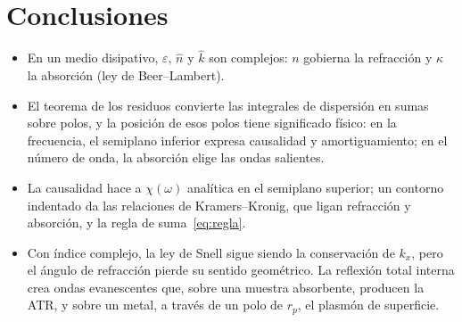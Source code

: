 \documentclass[11pt,letterpaper]{article}
\newcommand{\nh}{\hat{n}}
\newcommand{\kh}{\hat{k}}
\newcommand{\eps}{\varepsilon}
\begin{document}
\section{Conclusiones}

\begin{itemize}
  \item En un medio disipativo, $\eps$, $\nh$ y $\kh$ son complejos: $n$
  gobierna la refracción y $\kappa$ la absorción (ley de Beer--Lambert).
  \item El teorema de los residuos convierte las integrales de dispersión en
  sumas sobre polos, y la posición de esos polos tiene significado físico: en
  la frecuencia, el semiplano inferior expresa causalidad y amortiguamiento;
  en el número de onda, la absorción elige las ondas salientes.
  \item La causalidad hace a $\chi(\omega)$ analítica en el semiplano
  superior; un contorno indentado da las relaciones de Kramers--Kronig, que
  ligan refracción y absorción, y la regla de suma~\eqref{eq:regla}.
  \item Con índice complejo, la ley de Snell sigue siendo la conservación de
  $k_x$, pero el ángulo de refracción pierde su sentido geométrico. La
  reflexión total interna crea ondas evanescentes que, sobre una muestra
  absorbente, producen la ATR, y sobre un metal, a través de un polo de $r_p$,
  el plasmón de superficie.
\end{itemize}
\end{document}
